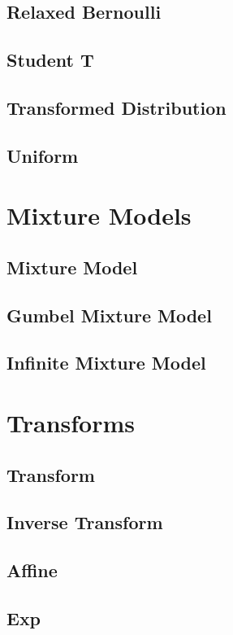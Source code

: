 \documentclass{article}
\begin{document}
\subsection{Relaxed Bernoulli}
\subsection{Student T}
\subsection{Transformed Distribution}
\subsection{Uniform}

\section{Mixture Models}
\subsection{Mixture Model}
\subsection{Gumbel Mixture Model}
\subsection{Infinite Mixture Model}

\section{Transforms}
\subsection{Transform}
\subsection{Inverse Transform}
\subsection{Affine}
\subsection{Exp}
\end{document}
